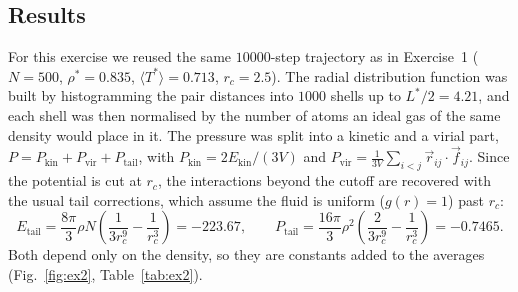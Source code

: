 \documentclass[11pt,a4paper]{article}
\begin{document}




\subsection{Results}
For this exercise we reused the same $10000$-step trajectory as in Exercise~1 ($N = 500$, $\rho^* = 0.835$, $\langle T^*\rangle = 0.713$, $r_c = 2.5$). The radial distribution function was built by histogramming the pair distances into $1000$ shells up to $L^*/2 = 4.21$, and each shell was then normalised by the number of atoms an ideal gas of the same density would place in it. The pressure was split into a kinetic and a virial part, $P = P_{\text{kin}} + P_{\text{vir}} + P_{\text{tail}}$, with $P_{\text{kin}} = 2E_{\text{kin}}/(3V)$ and $P_{\text{vir}} = \frac{1}{3V}\sum_{i<j}\vec{r}_{ij}\cdot\vec{f}_{ij}$. Since the potential is cut at $r_c$, the interactions beyond the cutoff are recovered with the usual tail corrections, which assume the fluid is uniform ($g(r) = 1$) past $r_c$:
\begin{equation}
  E_{\text{tail}} = \frac{8\pi}{3}\rho N\left(\frac{1}{3r_c^9} - \frac{1}{r_c^3}\right) = -223.67, \qquad
  P_{\text{tail}} = \frac{16\pi}{3}\rho^2\left(\frac{2}{3r_c^9} - \frac{1}{r_c^3}\right) = -0.7465.
\end{equation}
Both depend only on the density, so they are constants added to the averages (Fig.~\ref{fig:ex2}, Table~\ref{tab:ex2}).
\end{document}
